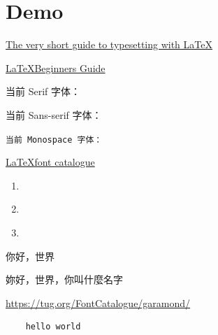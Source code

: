 \section{Demo}

\href{https://www.bu.edu/math/files/2013/08/ShortTeX3.pdf}{The very short guide to typesetting with \LaTeX}

\href{https://static.latexstudio.net/wp-content/uploads/2015/03/LaTeX_Beginners_Guide.pdf}{\LaTeX Beginners Guide}

当前 Serif 字体：\fontname\font

\textsf{当前 Sans-serif 字体：\fontname\font}

\texttt{当前 Monospace 字体：\fontname\font}

\href{https://tug.org/FontCatalogue/}{\LaTeX font catalogue}

\begin{enumerate}
    \item \href{https://tug.org/FontCatalogue/seriffonts.html}{}
    \item \href{https://tug.org/FontCatalogue/typewriterfonts.html}{}
    \item \href{https://tug.org/FontCatalogue/sansseriffonts.html}{}
\end{enumerate}

你好，世界

妳好，世界，你叫什麼名字

\href{URL}{https://tug.org/FontCatalogue/garamond/}



\begin{lstlisting}
    hello world
\end{lstlisting}

\begin{table}[H]
    \centering
    \caption{table demo}
    \label{table:result_table}
\end{table}


